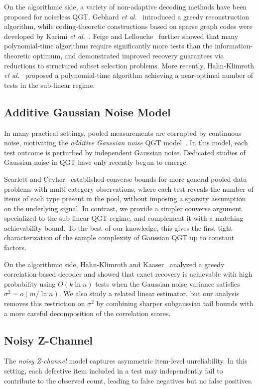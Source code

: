 \documentclass{article}
\begin{document}
On the algorithmic side, a variety of non-adaptive decoding methods have been proposed for noiseless QGT. Gebhard \emph{et al.}~\cite{gebhard2019quantitative} introduced a greedy reconstruction algorithm, while coding-theoretic constructions based on sparse graph codes were developed by Karimi \emph{et al.}~\cite{karimi2019}. Feige and Lellouche~\cite{feige_quantitative_2020} further showed that many polynomial-time algorithms require significantly more tests than the information-theoretic optimum, and demonstrated improved recovery guarantees via reductions to structured subset selection problems. More recently, Hahn-Klimroth \emph{et al.}~\cite{hahn-klimroth_near_2022} proposed a polynomial-time algorithm achieving a near-optimal number of tests in the sub-linear regime.

\subsection{Additive Gaussian Noise Model}
In many practical settings, pooled measurements are corrupted by continuous noise, motivating the \emph{additive Gaussian noise} QGT model~\cite{hahn-klimroth_near_2022,tan2024approximate}. In this model, each test outcome is perturbed by independent Gaussian noise. Dedicated studies of Gaussian noise in QGT have only recently begun to emerge.

Scarlett and Cevher~\cite{scarlett2017phase} established converse bounds for more general pooled-data problems with multi-category observations, where each test reveals the number of items of each type present in the pool, without imposing a sparsity assumption on the underlying signal. In contrast, we provide a simpler converse argument specialized to the sub-linear QGT regime, and complement it with a matching achievability bound. To the best of our knowledge, this gives the first tight characterization of the sample complexity of Gaussian QGT up to constant factors.

On the algorithmic side, Hahn-Klimroth and Kaaser~\cite{hahn-klimroth_distributed_2022} analyzed a greedy correlation-based decoder and showed that exact recovery is achievable with high probability using $O(k\ln n)$ tests when the Gaussian noise variance satisfies $\sigma^2=o(m/\ln n)$. We also study a related linear estimator, but our analysis removes this restriction on $\sigma^2$ by combining sharper subgaussian tail bounds with a more careful decomposition of the correlation scores.

\subsection{Noisy Z-Channel}
The \emph{noisy Z-channel} model captures asymmetric item-level unreliability. In this setting, each defective item included in a test may independently fail to contribute to the observed count, leading to false negatives but no false positives.
\end{document}
